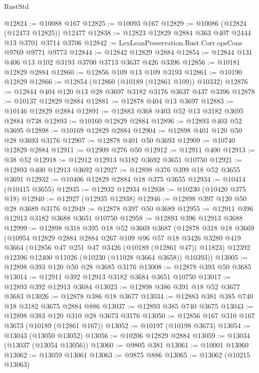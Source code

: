 \begin{lexlean}{RustStd}
\begin{coremodule}
@12824 := @10088 @167
@12825 := @10093 @167
@12829 := @10086 (@12824 (@12473 @12825)) @12477
@12838 := @12823 @12829 @2884 @363 @407 @2444 @13 @3701 @3714 @3706
@12842 := LexLeanPreservation.Rust.Corr.opsCons @9769 @9771 @9773
@12844 := @12842 @12829 @2884
@12854 := @12844 @131 @406 @13 @102 @3193 @3700 @3713 @3637 @426 @3396
@12856 := @10181 @12829 @2884
@12860 := @12856 @109 @13 @109 @3193
@12861 := @10190 @12829
@12866 := @12854 (@12860 (@10189 (@12861 @109)) @10332)
@12876 := @12844 @404 @120 @13 @28 @3697 @3182 @3176 @3637 @437 @3396
@12878 := @10137 @12829 @2884
@12881 := @12878 @404 @13 @3697
@12883 := @10146 @12829 @2884
@12891 := @12883 @368 @403 @52 @13 @3182 @3695 @2884 @738
@12893 := @10160 @12829 @2884
@12896 := @12893 @403 @52 @3695
@12898 := @10169 @12829 @2884
@12904 := @12898 @401 @120 @50 @28 @3693 @3176
@12907 := @12878 @401 @50 @3693
@12909 := @10740 @12829 @2884
@12911 := @12909 @276 @50
@12912 := @12911 @400
@12913 := @38 @52
@12918 := @12912 @12913 @3182 @3692 @3651 @10750
@12921 := @12893 @400 @12913 @3692
@12927 := @12898 @376 @399 @18 @52 @3655 @3691
@12932 := @10406 @12829 @2884 @18 @375 @3655
@12934 := @10414 (@10415 @3655)
@12935 := @12932 @12934
@12938 := @10230 (@10420 @375 @18)
@12940 := @12927 (@12935 @12938)
@12946 := @12898 @397 @120 @50 @28 @3689 @3176
@12949 := @12878 @397 @50 @3689
@12955 := @12911 @396 @12913 @3182 @3688 @3651 @10750
@12958 := @12893 @396 @12913 @3688
@12999 := @12898
    @318
    @395
    @18
    @52
    @3669
    @3687
    (@12878
      @318
      @18
      @3669
      (@10954
        @12829
        @2884
        @2884
        @267
        @109
        @96
        @57
        @18
        @3426
        @3280
        @419
        @3664
        (@12856 @47 @251 @47 @3426 (@10189 (@12861 @47)) @11823)
        @12392
        @12396
        @12400
        @11026
        (@10230 (@11028 @3664 @3658))
        @10393))
@13005 := @12898 @393 @120 @50 @28 @3685 @3176
@13008 := @12878 @393 @50 @3685
@13014 := @12911 @392 @12913 @3182 @3684 @3651 @10750
@13017 := @12893 @392 @12913 @3684
@13023 := @12898 @386 @391 @18 @52 @3677 @3683
@13026 := @12878 @386 @18 @3677
@13034 := @12883 @381 @385 @740 @18 @3182 @3675 @2884 @886
@13037 := @12893 @385 @740 @3675
@13043 := @12898 @383 @120 @310 @28 @3673 @3176
@13050 := @12856 @167 @310 @167 @3673 (@10189 (@12861 @167))
@13052 := @10197 (@10198 @3673)
@13054 := @13043 (@13050 @13052)
@13056 := @10206 @12829 @2884
@13059 := @13034 (@13037 (@13054 @13056))
@13060 := @9805 @381
@13061 := @10001 @13060
@13062 := @13059 @13061
@13063 := @9875 @886
@13065 := @13062 (@10215 @13063)

\end{coremodule}
\end{lexlean}
